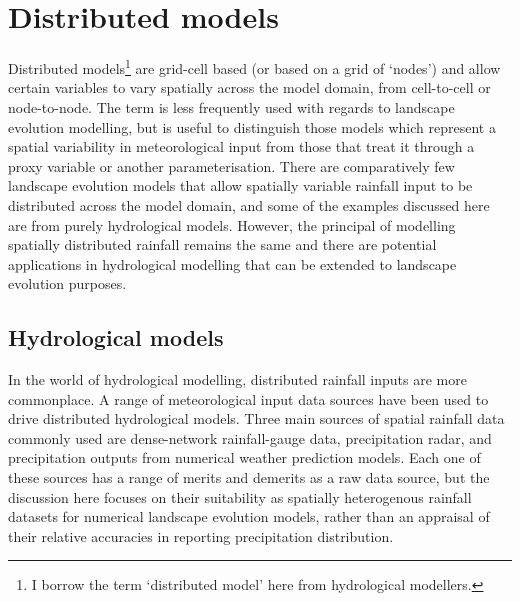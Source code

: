 \section{Distributed models}
Distributed models\footnote{I borrow the term `distributed model' here from hydrological modellers.} are grid-cell based (or based on a grid of `nodes') and allow certain variables to vary spatially across the model domain, from cell-to-cell or node-to-node. The term is less frequently used with regards to landscape evolution modelling, but is useful to distinguish those models which represent a spatial variability in meteorological input from those that treat it through a proxy variable or another parameterisation. There are comparatively few landscape evolution models that allow spatially variable rainfall input to be distributed across the model domain, and some of the examples discussed here are from purely hydrological models. However, the principal of modelling spatially distributed rainfall remains the same and there are potential applications in hydrological modelling that can be extended to landscape evolution purposes. 

\subsection{Hydrological models}
In the world of hydrological modelling, distributed rainfall inputs are more commonplace. A range of meteorological input data sources have been used to drive distributed hydrological models. Three main sources of spatial rainfall data commonly used are dense-network rainfall-gauge data, precipitation radar, and precipitation outputs from numerical weather prediction models. Each one of these sources has a range of merits and demerits as a raw data source, but the discussion here focuses on their suitability as spatially heterogenous rainfall datasets for numerical landscape evolution models, rather than an appraisal of their relative accuracies in reporting precipitation distribution.

